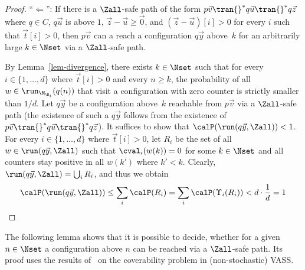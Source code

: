 \begin{proof}
  ``$\Leftarrow$'': If there is a $\Zall$-safe 
  path of the form $p\vec{v} \tran{}^* q\vec{u} \tran{}^* q\vec{z}$
  where $q \in C$, $q\vec{u}$ is above $1$, $\vec{z} - \vec{u} \geq \vec{0}$,
  and $(\vec{z} - \vec{u})[i] > 0$ for every $i$ such that $\vec{t}[i] > 0$, then
  $p\vec{v}$ can a reach a configuration $q\vec{y}$ above~$k$ for an 
  arbitrarily large $k \in \Nset$ via a $\Zall$-safe path.

  By Lemma~\ref{lem-divergence}, there exists
  $k \in \Nset$ such that for every $i \in \{1,\ldots,d\}$ where 
  $\vec{t}[i] > 0$ and every $n \geq k$,
  the probability of all $w \in \run_{\M_{\B_i}}(q(n))$ that 
  visit a configuration with zero counter is strictly smaller than 
  \mbox{$1/d$}. Let $q\vec{y}$ be a configuration above~$k$ reachable
  from $p\vec{v}$ via a $\Zall$-safe path (the existence of such 
  a $q\vec{y}$ follows from the existence of
  $p\vec{v} \tran{}^* q\vec{u} \tran{}^* q\vec{z}$). It suffices
  to show that $\calP(\run(q\vec{y},\Zall)) < 1$. For every 
  $i \in  \{1,\ldots,d\}$ where $\vec{t}[i] > 0$,
  let $R_i$ be the set of all $w \in \run(q\vec{y},\Zall)$ such that
  $\cval_i(w(k)) = 0$ for some $k \in \Nset$ and
  all counters stay positive in all $w(k')$ where $k' < k$. 
  Clearly, $\run(q\vec{y},\Zall) = \bigcup_{i} R_i$, and thus we obtain
  \begin{equation*}
    \calP(\run(q\vec{y},\Zall)) \leq \sum_{i} \calP(R_i) =
    \sum_{i} \calP(\Upsilon_i(R_i)) <  d \cdot \frac{1}{d} = 1
  \end{equation*}
\end{proof}

The following lemma shows that it is possible to decide, whether for a given $n\in\Nset$ a configuration above $n$ can be reached via a $\Zall$-safe path. Its proof uses the results of~\cite{BG:VASS-coverability} on the coverability problem in (non-stochastic) VASS.

